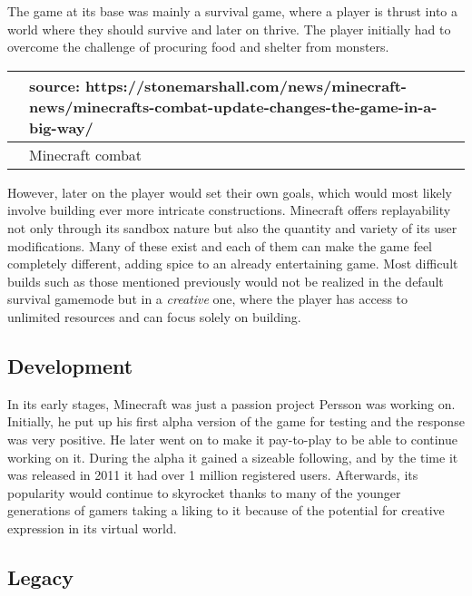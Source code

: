 \documentclass[a4paper,10pt]{book}
\begin{document}
 
          The game at its base was mainly a survival game, where a player is thrust into a world where they should survive
          and later on thrive. The player initially had to overcome the challenge of procuring food and shelter from monsters.
         
 
 \begin{longtable}{p{1mm}|l|}\hline
 
 &   source: https://stonemarshall.com/news/minecraft-news/minecrafts-combat-update-changes-the-game-in-a-big-way/  
 \\\hline
 
 & Minecraft combat 
 \\\hline
 \end{longtable}
 
 
          However, later on the player would set their own goals, which would most likely involve building ever more intricate
          constructions. Minecraft offers replayability not only through its sandbox nature but also the quantity and variety
          of its user modifications. Many of these exist and each of them can make the game feel completely different, adding
          spice to an already entertaining game. Most difficult builds such as those mentioned previously would not be realized
          in the default survival gamemode but in a  \textit{creative } one, where the player has access to unlimited resources and can
          focus solely on building.
         
 
 \subsection{Development }
 
          In its early stages, Minecraft was just a passion project Persson was working on. Initially, he put up his
          first alpha version of the game for testing and the response was very positive. He later went on to
          make it pay-to-play to be able to continue working on it. During the alpha it gained a sizeable
          following, and by the time it was released in 2011 it had over 1 million registered users. Afterwards, its
          popularity would continue to skyrocket thanks to many of the younger generations of gamers taking
          a liking to it because of the potential for creative expression in its virtual world.
         
 
 \subsection{Legacy }
 
\end{document}
